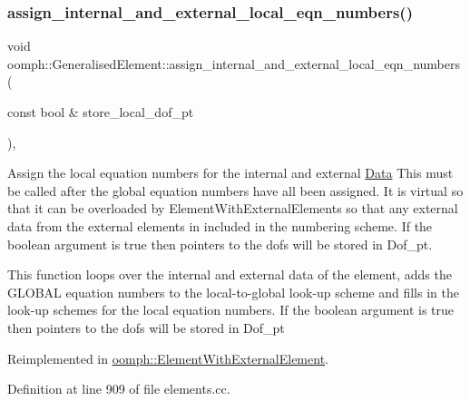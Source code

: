\mbox{\label{classoomph_1_1GeneralisedElement_aa4884467f33b95c17e2e57e592ccd480}} 
\subsubsection{\texorpdfstring{assign\+\_\+internal\+\_\+and\+\_\+external\+\_\+local\+\_\+eqn\+\_\+numbers()}{assign\_internal\_and\_external\_local\_eqn\_numbers()}}
{\footnotesize\ttfamily void oomph\+::\+Generalised\+Element\+::assign\+\_\+internal\+\_\+and\+\_\+external\+\_\+local\+\_\+eqn\+\_\+numbers (\begin{DoxyParamCaption}\item[{const bool \&}]{store\+\_\+local\+\_\+dof\+\_\+pt }\end{DoxyParamCaption})\hspace{0.3cm}{\ttfamily [protected]}, {\ttfamily [virtual]}}



Assign the local equation numbers for the internal and external \hyperlink{classoomph_1_1Data}{Data} This must be called after the global equation numbers have all been assigned. It is virtual so that it can be overloaded by Element\+With\+External\+Elements so that any external data from the external elements in included in the numbering scheme. If the boolean argument is true then pointers to the dofs will be stored in Dof\+\_\+pt. 

This function loops over the internal and external data of the element, adds the G\+L\+O\+B\+AL equation numbers to the local-\/to-\/global look-\/up scheme and fills in the look-\/up schemes for the local equation numbers. If the boolean argument is true then pointers to the dofs will be stored in Dof\+\_\+pt 

Reimplemented in \hyperlink{classoomph_1_1ElementWithExternalElement_ab8f4dda35ec3b01fe97701d7047b3a9d}{oomph\+::\+Element\+With\+External\+Element}.



Definition at line 909 of file elements.\+cc.



